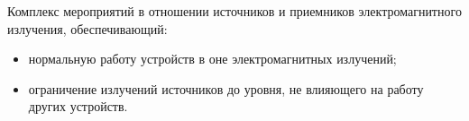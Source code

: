 Комплекс мероприятий в отношении источников и 
приемников электромагнитного излучения, обеспечивающий:
\begin{itemize}
    \item нормальную работу устройств в оне электромагнитных излучений;
    \item ограничение излучений источников до уровня, не влияющего на работу других устройств.
\end{itemize}